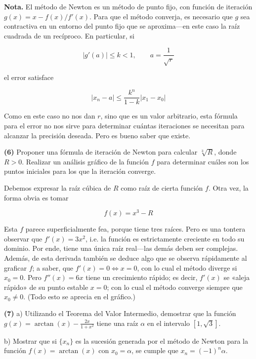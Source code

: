 \documentclass[12pt]{article}
\begin{document}
\textbf{Nota.} El método de Newton es un método de punto fijo, con función de
iteración $g(x) = x - f(x) / f'(x)$. Para que el método converja, es necesario
que $g$ sea contractiva en un entorno del punto fijo que se aproxima---en este
caso la raíz cuadrada de un recíproco. En particular, si 

\begin{equation*}
    \left| g'(a) \right| \leq k < 1, \qquad a = \frac{1}{\sqrt{r}}
\end{equation*}

el error satisface 

\begin{equation*}
    \left| x_n - a \right| \leq \frac{k^n}{1-k} \left| x_1 - x_0 \right|
\end{equation*}

Como en este caso no nos dan $r$, sino que es un valor arbitrario, esta fórmula
para el error no nos sirve para determinar cuántas iteraciones se necesitan para
alcanzar la precisión deseada. Pero es bueno saber que existe.

\pagebreak 

\begin{myframe}
    \textbf{(6)} Proponer una fórmula de iteración de Newton para calcular $\sqrt[3]{R}$, donde $R > 0$. Realizar un análisis gráfico de la función $f$ para determinar cuáles son los puntos iniciales para los que la iteración converge.
\end{myframe}


Debemos expresar la raíz cúbica de $R$ como raíz de cierta función $f$. Otra
vez, la forma obvia es tomar 

\begin{equation*}
    f(x) = x^3 - R
\end{equation*}

Esta $f$ parece superficialmente fea, porque tiene tres raíces. Pero es una
tontera observar que $f'(x) = 3x^2$, i.e. la función es estrictamente creciente
en todo su dominio. Por ende, tiene una única raíz real---las demás deben ser
complejas. Además, de esta derivada  también se deduce algo que se observa
rápidamente al graficar $f$; a saber, que $f'(x) = 0 \iff x = 0$, con lo cual el
método diverge si $x_0 = 0$. Pero $f''(x) = 6x$ tiene un crecimiento rápido; es
decir, $f'(x)$ se «aleja rápido» de su punto estable $x = 0$; con lo cual el
método converge siempre que $x_0 \neq 0$. (Todo esto se aprecia en el gráfico.)

\pagebreak 

\begin{myframe}
    
\textbf{(7)} a) Utilizando el Teorema del Valor Intermedio, demostrar que la función $g(x) = \arctan(x) - \frac{2x}{1+x^2}$ tiene una raíz $\alpha$ en el intervalo $[1, \sqrt{3}]$.

   b) Mostrar que si $\{x_n\}$ es la sucesión generada por el método de Newton para la función $f(x) = \arctan(x)$ con $x_0 = \alpha$, se cumple que $x_n = (-1)^n \alpha$.
\end{myframe}
\end{document}
